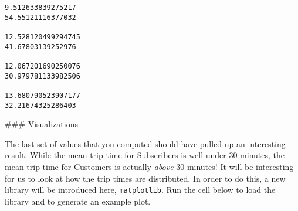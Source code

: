\documentclass[11pt]{article}
\begin{document}
    \begin{Verbatim}[commandchars=\\\{\}]
9.512633839275217
54.55121116377032

12.528120499294745
41.67803139252976

12.067201690250076
30.979781133982506

13.680790523907177
32.21674325286403

    \end{Verbatim}

     \#\#\# Visualizations

The last set of values that you computed should have pulled up an
interesting result. While the mean trip time for Subscribers is well
under 30 minutes, the mean trip time for Customers is actually
\emph{above} 30 minutes! It will be interesting for us to look at how
the trip times are distributed. In order to do this, a new library will
be introduced here, \texttt{matplotlib}. Run the cell below to load the
library and to generate an example plot.
\end{document}
